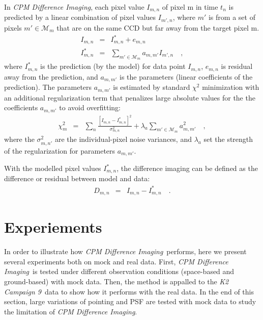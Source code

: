 \documentclass[12pt, preprint]{aastex}
\newcommand{\project}[1]{\textsl{#1}}
\newcommand{\cpmdiff}{\project{CPM Difference Imaging}}
\newcommand{\KTCN}{\project{K2 Campaign 9}}
\newcommand{\set}[1]{\mathcal{#1}}
\begin{document}
In \cpmdiff, each pixel value $I_{m,n}$ of pixel m in time $t_n$ is predicted by a linear combination of pixel values $I_{m',n}$, where $m'$ is from a set of pixels $m'\in\set{M}_m$ that are on the same CCD but far away from the target pixel m.
\begin{eqnarray}
I_{m,n}         &=& I^{\ast}_{m,n} + e_{m,n}
\\
I^{\ast}_{m,n}  &=& \sum_{m'\in\set{M}_m} a_{m,m'}I_{m',n} 
\quad,
\end{eqnarray}
where $I^{\ast}_{m,n}$ is the prediction (by the model) for data point $I_{m,n}$, $e_{m,n}$ is residual away from the prediction, and $a_{m,m'}$ is the parameters (linear coefficients of the prediction).
The parameters $a_{m,m'}$ is estimated by standard $\chi^2$ minimization with an additional regularization term that penalizes large absolute values for the the coefficients $a_{m,m'}$ to avoid overfitting:
\begin{eqnarray}
\chi^2_{m}    &=& \sum_{n} \frac{[I_{m,n} - I^{\ast}_{m,n}]^2}{\sigma^2_{m,n}}+ \lambda_{a}\sum_{m'\in\set{M}_m}a_{m,m'}^2 
\quad,
\end{eqnarray}
where the $\sigma^2_{m,n'}$ are the individual-pixel noise variances, and $\lambda_{a}$ set the strength of the regularization for parameters $a_{m,m'}$.

With the modelled pixel values $I^{\ast}_{m,n}$, the difference imaging can be defined as the difference or residual between model and data:
\begin{eqnarray}
D_{m,n} &=& I_{m,n} - I^{\ast}_{m,n}
\quad.
\end{eqnarray}

\section{Experiements}
In order to illustrate how \cpmdiff\ performs, here we present several experiments both on mock and real data. 
First, \cpmdiff\ is tested under different observation conditions (space-based and ground-based) with mock data. 
Then,  the method is appalled to the \KTCN\ data to show how it performs with the real data. 
In the end of this section,  large variations of pointing and PSF are tested with mock data to study the limitation of \cpmdiff.
\end{document}
